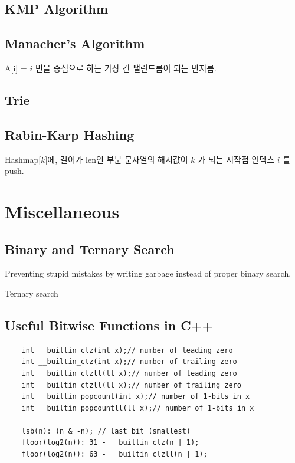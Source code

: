 \documentclass[landscape,8pt]{article}
\begin{document}
\begin{multicols}{2}
  \subsection{KMP Algorithm}
    
  \subsection{Manacher's Algorithm}
    A[i] = $i$ 번을 중심으로 하는 가장 긴 팰린드롬이 되는 반지름.
    
  \subsection{Trie}
    
  \subsection{Rabin-Karp Hashing}
    Hashmap[$k$]에, 길이가 len인 부분 문자열의 해시값이 $k$ 가 되는 시작점 인덱스 $i$ 를 push.
    
\columnbreak

\section{Miscellaneous}
  \subsection{Binary and Ternary Search}
    Preventing stupid mistakes by writing garbage instead of proper binary search.
    
    Ternary search
    
  \subsection{Useful Bitwise Functions in C++}
  \begin{verbatim}
    int __builtin_clz(int x);// number of leading zero
    int __builtin_ctz(int x);// number of trailing zero
    int __builtin_clzll(ll x);// number of leading zero
    int __builtin_ctzll(ll x);// number of trailing zero
    int __builtin_popcount(int x);// number of 1-bits in x
    int __builtin_popcountll(ll x);// number of 1-bits in x

    lsb(n): (n & -n); // last bit (smallest)
    floor(log2(n)): 31 - __builtin_clz(n | 1);
    floor(log2(n)): 63 - __builtin_clzll(n | 1);


\end{verbatim}
\end{multicols}
\end{document}
